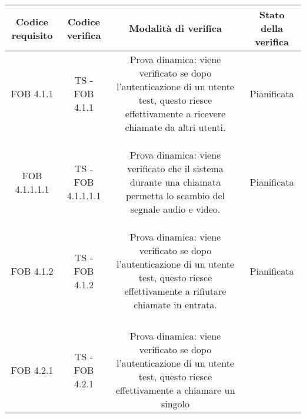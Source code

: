 {{		\newpage

		\begin{table}[h!]
			\begin{center}
			\scriptsize
					\begin{minipage}{1\linewidth}
						\begin{tabular}{c c c c}				
						\toprule
							Codice requisito& Codice verifica & Modalità di verifica & Stato della verifica \\ 
						\midrule	
						FOB 4.1.1
						&
						TS - FOB 4.1.1		
						& 
						\begin{minipage}{0.55\linewidth}
							Prova dinamica: viene verificato se dopo l'autenticazione di un
							utente test, questo riesce effettivamente a ricevere chiamate da
							altri utenti.
						\end{minipage}	
						&
						Pianificata
						\\
						\\
						\bottomrule
						\\\\
						FOB  4.1.1.1.1 
						&
						TS - FOB  4.1.1.1.1  			
						& 
						\begin{minipage}{0.55\linewidth}
							Prova dinamica: viene verificato che il sistema durante una
							chiamata permetta lo scambio del segnale audio e 
							video.
						\end{minipage}	
						&
						Pianificata
						\\
						\\
						\bottomrule
						\\\\
						FOB 4.1.2 
						&
						TS - FOB 4.1.2  			
						& 
						\begin{minipage}{0.55\linewidth}
							Prova dinamica: viene verificato se dopo l'autenticazione di un
							utente test, questo riesce effettivamente a rifiutare chiamate
							in entrata.
						\end{minipage}	
						&
						Pianificata
						\\
						\\
						\bottomrule
						\\\\\\
						FOB 4.2.1
						&
						TS - FOB 4.2.1 			
						& 
						\begin{minipage}{0.55\linewidth}
							Prova dinamica: viene verificato se dopo l'autenticazione di un
							utente test, questo riesce effettivamente a chiamare un singolo

\end{minipage}
\end{tabular}
\end{minipage}
\end{center}
\end{table}}}

